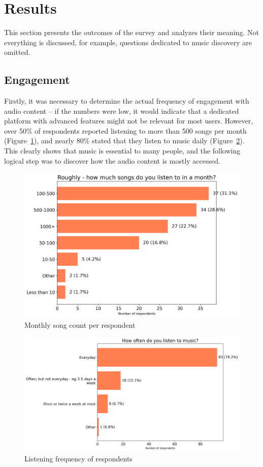\section{Results}
This section presents the outcomes of the survey and analyzes their meaning. Not everything is discussed, for example,
questions dedicated to music discovery are omitted.

\subsection{Engagement}
Firstly, it was necessary to determine the actual frequency of engagement with audio content -- if the numbers were low,
it would indicate that a dedicated platform with advanced features might not be relevant for most users.
However, over 50\% of respondents reported listening to more than 500 songs per month (Figure~\ref{fig:song_amount}),
and nearly 80\% stated that they listen to music daily (Figure~\ref{fig:listen_reg}).
This clearly shows that music is essential to many people, and the following logical step was to discover
how the audio content is mostly accessed.

\begin{figure}[htbp]
    \centering
    \includegraphics[height=0.4\textheight]{charts/song amount month.png}
    \caption{Monthly song count per respondent}
    \label{fig:song_amount}
\end{figure}

\begin{figure}[htbp]
    \centering
    \includegraphics[height=0.4\textheight]{charts/listening regularity.png}
    \caption{Listening frequency of respondents}
    \label{fig:listen_reg}
\end{figure}

